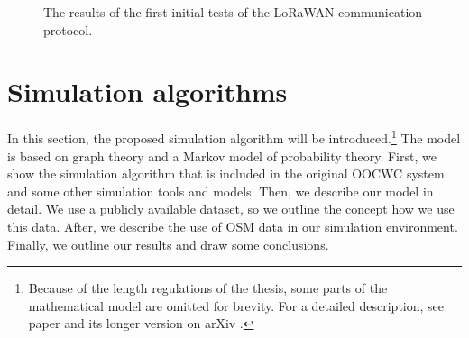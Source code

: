 \documentclass[b5paper,12pt]{report}
\theoremstyle{definition}
\begin{document}
\begin{figure}[!ht]
\begin{minipage}{.4\linewidth}
\end{minipage}
\centering
\caption{The results of the first initial tests of the LoRaWAN communication protocol.}\label{lorawan-test} 
\end{figure}

\chapter{Simulation algorithms}
\label{simul}

In this section, the proposed simulation algorithm will be introduced.\footnote{Because of the length regulations of the thesis, some parts of the mathematical model are omitted for brevity. For a detailed description, see paper \cite{traffic-paper} and its longer version on arXiv \cite{besenczi2020largescale}.} The model is based on graph theory and a Markov model of probability theory. First, we show the simulation algorithm that is included in the original OOCWC system and some other simulation tools and models. Then, we describe our model in detail. We use a publicly available dataset, so we outline the concept how we use this data. After, we describe the use of OSM data in our simulation environment. Finally, we outline our results and draw some conclusions.
\end{document}
